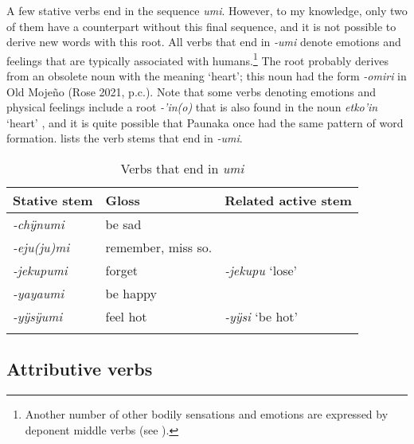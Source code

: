 A few stative verbs end in the sequence \textit{umi}. However, to my knowledge, only two of them have a counterpart without this final sequence, and it is not possible to derive new words with this root. All verbs that end in \textit{-umi} denote emotions and feelings that are typically associated with humans.\footnote{Another number of other bodily sensations and emotions are expressed by deponent middle verbs (see ).} The root probably derives from an obsolete noun with the meaning ‘heart’; this noun had the form \textit{-omiri} in Old Mojeño (Rose 2021, p.c.). Note that some  verbs denoting emotions and physical feelings include a root \textit{-’in(o)} that is also found in the noun \textit{etko’in} ‘heart’ \citep[231]{Danielsen2007}, and it is quite possible that Paunaka once had the same pattern of word formation.  lists the verb stems that end in \textit{-umi}.

\begin{table}
\caption[Verbs that end in \textit{umi}]{Verbs that end in \textit{umi}}

\begin{tabular}{lll}
\lsptoprule
Stative stem & Gloss & Related active stem \\
\midrule
\textit{-chÿnumi} & be sad & \\
\textit{-eju(ju)mi} & remember, miss so. & \\
\textit{-jekupumi} & forget & \textit{-jekupu} ‘lose’\\
\textit{-yayaumi} & be happy & \\
\textit{-yÿsÿumi} & feel hot & \textit{-yÿsi} ‘be hot’\\
\lspbottomrule
\end{tabular}

\label{table:stat-MI}
\end{table}

%
\subsection{Attributive verbs}\label{sec:AttributiveVerbs}

